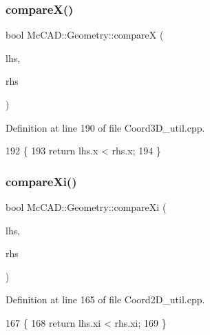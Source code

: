 \subsubsection{\texorpdfstring{compare\+X()}{compareX()}}
{\footnotesize\ttfamily bool Mc\+C\+A\+D\+::\+Geometry\+::compareX (\begin{DoxyParamCaption}\item[{const \hyperlink{classMcCAD_1_1Geometry_1_1Coord3D}{Coord3D} \&}]{lhs,  }\item[{const \hyperlink{classMcCAD_1_1Geometry_1_1Coord3D}{Coord3D} \&}]{rhs }\end{DoxyParamCaption})}



Definition at line 190 of file Coord3\+D\+\_\+util.\+cpp.


\begin{DoxyCode}
192                            \{
193     \textcolor{keywordflow}{return} lhs.x < rhs.x;
194 \}
\end{DoxyCode}
\mbox{\label{namespaceMcCAD_1_1Geometry_a4eeda1c28d0134d4526b7ec0c4647ad1}} 
\subsubsection{\texorpdfstring{compare\+Xi()}{compareXi()}}
{\footnotesize\ttfamily bool Mc\+C\+A\+D\+::\+Geometry\+::compare\+Xi (\begin{DoxyParamCaption}\item[{const \hyperlink{classMcCAD_1_1Geometry_1_1Coord2D}{Coord2D} \&}]{lhs,  }\item[{const \hyperlink{classMcCAD_1_1Geometry_1_1Coord2D}{Coord2D} \&}]{rhs }\end{DoxyParamCaption})}



Definition at line 165 of file Coord2\+D\+\_\+util.\+cpp.


\begin{DoxyCode}
167                            \{
168     \textcolor{keywordflow}{return} lhs.xi < rhs.xi;
169 \}
\end{DoxyCode}
\mbox{\label{namespaceMcCAD_1_1Geometry_af7f009e085c930ab1649c9030ba3cedb}} 
